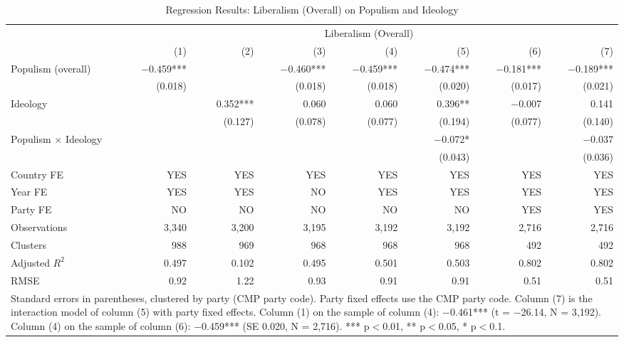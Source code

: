 \begin{table}
\caption{Regression Results: Liberalism (Overall) on Populism and Ideology}
\label{tab:4}
\scriptsize\setlength{\tabcolsep}{4pt}
\centering
\begin{tabular}{lrrrrrrr}
\toprule
 & \multicolumn{7}{c}{Liberalism (Overall)} \\
 & (1) & (2) & (3) & (4) & (5) & (6) & (7) \\
 \midrule
Populism (overall) & $-$0.459*** &  & $-$0.460*** & $-$0.459*** & $-$0.474*** & $-$0.181*** & $-$0.189*** \\
& (0.018) &  & (0.018) & (0.018) & (0.020) & (0.017) & (0.021) \\
Ideology &  & 0.352*** & 0.060 & 0.060 & 0.396** & $-$0.007 & 0.141 \\
&  & (0.127) & (0.078) & (0.077) & (0.194) & (0.077) & (0.140) \\
Populism $\times$ Ideology &  &  &  &  & $-$0.072* &  & $-$0.037 \\
&  &  &  &  & (0.043) &  & (0.036) \\
\midrule
Country FE & YES & YES & YES & YES & YES & YES & YES\\
Year FE & YES & YES & NO & YES & YES & YES & YES\\
Party FE & NO & NO & NO & NO & NO & YES & YES\\
Observations & 3,340 & 3,200 & 3,195 & 3,192 & 3,192 & 2,716 & 2,716 \\
Clusters & 988 & 969 & 968 & 968 & 968 & 492 & 492 \\
Adjusted $R^2$ & 0.497 & 0.102 & 0.495 & 0.501 & 0.503 & 0.802 & 0.802 \\
RMSE & 0.92 & 1.22 & 0.93 & 0.91 & 0.91 & 0.51 & 0.51 \\
\bottomrule
\multicolumn{8}{p{0.9\linewidth}}{\scriptsize Standard errors in parentheses, clustered by party (CMP party code). Party fixed effects use the CMP party code. Column (7) is the interaction model of column (5) with party fixed effects. Column (1) on the sample of column (4): $-$0.461*** (t = $-$26.14, N = 3,192). Column (4) on the sample of column (6): $-$0.459*** (SE 0.020, N = 2,716). *** p$<$0.01, ** p$<$0.05, * p$<$0.1.} \\
\end{tabular}
\end{table}
